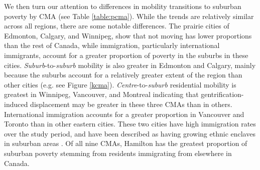 We then turn our attention to differences in mobility transitions to suburban poverty by CMA (see Table \ref{table:pcma}). While the trends are relatively similar across all regions, there are some notable differences. The prairie cities of Edmonton, Calgary, and Winnipeg, show that not moving has lower proportions than the rest of Canada, while immigration, particularly international immigrants, account for a greater proportion of poverty in the suburbs in these cities. \textit{Suburb}-to-\textit{suburb} mobility is also greater in Edmonton and Calgary, mainly because the suburbs account for a relatively greater extent of the region than other cities (e.g. see Figure \ref{kcma}).  \textit{Centre}-to-\textit{suburb} residential mobility is greatest in Winnipeg, Vancouver, and Montreal indicating that gentrification-induced displacement may be greater in these three CMAs than in others. International immigration accounts for a greater proportion in Vancouver and Toronto than in other eastern cities. These two cities have high immigration rates over the study period, and have been described as having growing ethnic enclaves in suburban areas \cite{grant_changing_2020}. Of all nine CMAs, Hamilton has the greatest proportion of suburban poverty stemming from residents immigrating from elsewhere in Canada.






